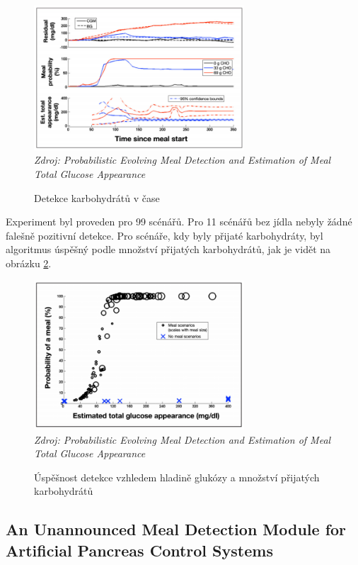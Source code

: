 \begin{figure}[H]
\caption{Detekce karbohydrátů v čase}
\label{fig:analyza:diff1}
\centering
\includegraphics[width=0.7\textwidth]{img/analyzaCHO/diff1.png}\\
\textit{Zdroj: Probabilistic Evolving Meal Detection and Estimation of Meal Total Glucose Appearance \citep{analyzaCHO.Diff}}
\end{figure}

Experiment byl proveden pro 99 scénářů. Pro 11 scénářů bez jídla nebyly žádné falešně pozitivní detekce. Pro scénáře, kdy byly přijaté karbohydráty, byl algoritmus úspěšný podle množství přijatých karbohydrátů, jak je vidět na obrázku \ref{fig:analyza:diff2}.

\begin{figure}[H]
\caption{Úspěšnost detekce vzhledem hladině glukózy a množství přijatých karbohydrátů}
\label{fig:analyza:diff2}
\centering
\includegraphics[width=0.7\textwidth]{img/analyzaCHO/diff2.png}\\
\textit{Zdroj: Probabilistic Evolving Meal Detection and Estimation of Meal Total Glucose Appearance \citep{analyzaCHO.Diff}}
\end{figure}


\subsection{An Unannounced Meal Detection Module for Artificial Pancreas Control Systems}
\label{ch:analyzaCHO:nekonzistence}

